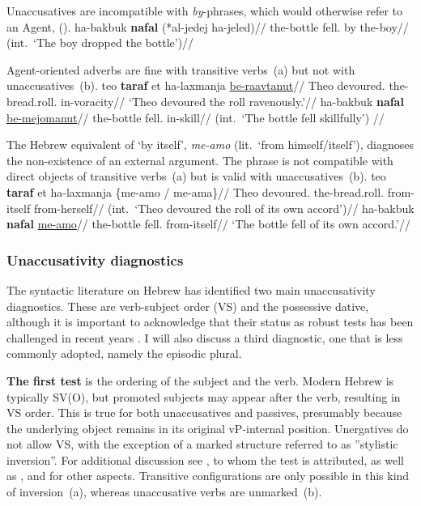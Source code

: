 Unaccusatives are incompatible with \emph{by}-phrases, which would otherwise refer to an Agent, (\nextx).
\ex \begingl
	\gla ha-bakbuk \textbf{nafal} (*al-jedej ha-jeled)//
	\glb the-bottle fell. by the-boy//
	\glft (int.~`The boy dropped the bottle')//
	\endgl
\xe

Agent-oriented adverbs are fine with transitive verbs~(\nextx a) but not with unaccusatives~(\nextx b).
\pex
	\a \begingl
		\gla teo \textbf{taraf} et ha-laxmanja \underline{be-raavtanut}//
		\glb Theo devoured.  the-bread.roll. in-voracity//
		\glft `Theo devoured the roll ravenously.'//
		\endgl
	\a \ljudge{*} \begingl
		\gla ha-bakbuk \textbf{nafal} \underline{be-mejomanut}//
		\glb the-bottle fell. in-skill//
		\glft (int.~`The bottle fell skillfully') //
		\endgl
\xe	

The Hebrew equivalent of `by itself', \emph{me-a{\ts}mo} (lit.~`from himself/itself'), diagnoses the non-existence of an external argument. The phrase is not compatible with direct objects of transitive verbs~(\nextx a) but is valid with unaccusatives~(\nextx b).
\pex
	\a \ljudge{*} \begingl
		\gla teo \textbf{taraf} et ha-laxmanja \{me-a{\ts}mo / me-a{\ts}ma\}//
		\glb Theo devoured.  the-bread.roll. from-itself {} from-herself//
		\glft (int.~`Theo devoured the roll of its own accord')//
		\endgl
	\a \begingl
		\gla ha-bakbuk \textbf{nafal} \underline{me-a{\ts}mo}//
		\glb the-bottle fell. from-itself//
		\glft `The bottle fell of its own accord.'//
		\endgl
\xe


		\subsubsection{Unaccusativity diagnostics} \label{voice:tkal:nact:unacc}
The syntactic literature on Hebrew has identified two main unaccusativity diagnostics. These are verb-subject order (VS) and the possessive dative, although it is important to acknowledge that their status as robust tests has been challenged in recent years \citep{gafter14li,linzen14pd,kastner17gjgl}. I will also discuss a third diagnostic, one that is less commonly adopted, namely the episodic plural.

\textbf{The first test} is the ordering of the subject and the verb. Modern Hebrew is typically SV(O), but promoted subjects may appear after the verb, resulting in VS order. This is true for both unaccusatives and passives, presumably because the underlying object remains in its original vP-internal position. Unergatives do not allow VS, with the exception of a marked structure referred to as ''stylistic inversion''. For additional discussion see \cite{shlonsky87}, to whom the test is attributed, as well as \cite{shlonskydoron91}, \cite{borer95} and \cite{preminger10} for other aspects. Transitive configurations are only possible in this kind of inversion~(\nextx a), whereas unaccusative verbs are unmarked~(\nextx b).

